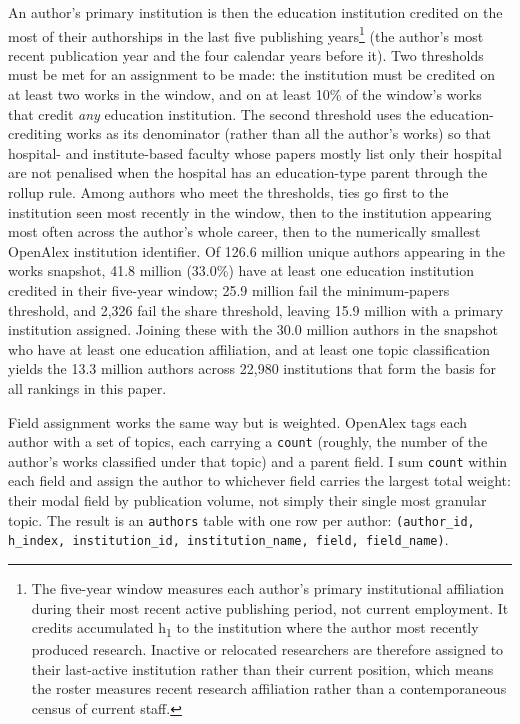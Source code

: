 An author's primary institution is then the education institution credited on the most of their authorships in the last five publishing years\textcolor{red}{\footnote{The five-year window measures each author's primary institutional affiliation during their most recent active publishing period, not current employment. It credits accumulated h\textsubscript{1} to the institution where the author most recently produced research. Inactive or relocated researchers are therefore assigned to their last-active institution rather than their current position, which means the roster measures recent research affiliation rather than a contemporaneous census of current staff.}} (the author's most recent publication year and the four calendar years before it). Two thresholds must be met for an assignment to be made: the institution must be credited on at least two works in the window, and on at least 10\% of the window's works that credit \emph{any} education institution. The second threshold uses the education-crediting works as its denominator (rather than all the author's works) so that hospital- and institute-based faculty whose papers mostly list only their hospital are not penalised when the hospital has an education-type parent through the rollup rule. Among authors who meet the thresholds, ties go first to the institution seen most recently in the window, then to the institution appearing most often across the author's whole career, then to the numerically smallest OpenAlex institution identifier. Of 126.6 million unique authors appearing in the works snapshot, 41.8 million (33.0\%) have at least one education institution credited in their five-year window; 25.9 million fail the minimum-papers threshold, and 2,326 fail the share threshold, leaving 15.9 million with a primary institution assigned. Joining these with the 30.0 million authors in the snapshot who have at least one education affiliation, and at least one topic classification yields the 13.3 million authors across 22,980 institutions that form the basis for all rankings in this paper.

Field assignment works the same way but is weighted. OpenAlex tags each author with a set of topics, each carrying a \texttt{count} (roughly, the number of the author's works classified under that topic) and a parent field. I sum \texttt{count} within each field and assign the author to whichever field carries the largest total weight: their modal field by publication volume, not simply their single most granular topic. The result is an \texttt{authors} table with one row per author: \texttt{(author\_id, h\_index, institution\_id, institution\_name, field, field\_name)}.

